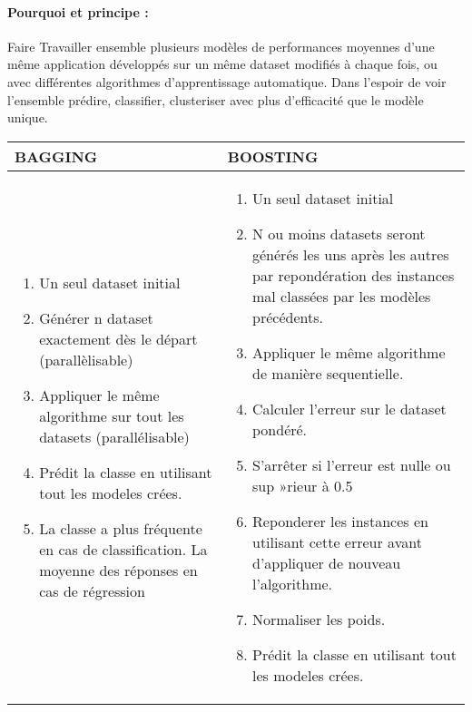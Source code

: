 \documentclass[a4paper, 12pt]{article}
\begin{document}
	\paragraph{Pourquoi et principe : } Faire  Travailler ensemble plusieurs modèles de performances moyennes d’une même application développés sur un même dataset modifiés à chaque fois, ou avec différentes algorithmes d’apprentissage automatique. Dans l’espoir de voir l’ensemble prédire, classifier, clusteriser avec plus d’efficacité que le modèle unique.
	\centering\newline
	\begin{tabular}{|>{\raggedright\arraybackslash}p{6cm}|>{\raggedright\arraybackslash}p{6cm}|}
		\hline \rowcolor{cyan} \textbf{{ BAGGING }} & \textbf{{ BOOSTING }}\\ \hline
		\begin{enumerate}
			\item \justifying  Un seul dataset initial   
			\item \justifying  Générer n dataset exactement dès le départ (parallèlisable)
			\item \justifying  Appliquer le même algorithme sur tout les datasets (parallélisable)
			\item \justifying  Prédit la classe en utilisant tout les modeles crées.
			\item \justifying  La classe a plus fréquente en cas de classification. La moyenne des réponses en cas de régression
		\end{enumerate}
		& \begin{enumerate}
			\item \justifying  Un seul dataset initial  
			\item \justifying  N ou moins datasets seront générés les uns après les autres par repondération des instances mal classées par les modèles précédents.
			\item \justifying  Appliquer le même algorithme de manière sequentielle.
			\item \justifying  Calculer l’erreur sur le dataset pondéré.
			\item \justifying  S’arrêter si l’erreur est nulle ou sup »rieur à 0.5 
			\item \justifying  Reponderer les instances en utilisant cette erreur avant d’appliquer de nouveau l’algorithme.
			\item \justifying  Normaliser les poids.
			\item \justifying  Prédit la classe en utilisant tout les modeles crées.
		\end{enumerate}
		\\
		\hline
	\end{tabular}
	\justifying
\end{document}
